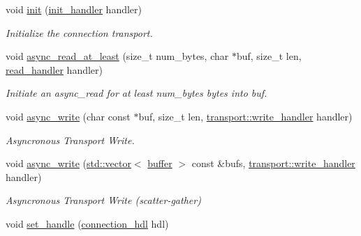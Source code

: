 \begin{DoxyCompactItemize}
\item 
void \mbox{\hyperlink{classwebsocketpp_1_1transport_1_1iostream_1_1connection_a771203b134cc012188a07c471907fc76}{init}} (\mbox{\hyperlink{namespacewebsocketpp_1_1transport_aeae75e675c1a334b3b33ab7120b480a5}{init\+\_\+handler}} handler)
\begin{DoxyCompactList}\small\item\em Initialize the connection transport. \end{DoxyCompactList}\item 
void \mbox{\hyperlink{classwebsocketpp_1_1transport_1_1iostream_1_1connection_ad66fa146a7cdc19bfca3e32da23b9c60}{async\+\_\+read\+\_\+at\+\_\+least}} (size\+\_\+t num\+\_\+bytes, char $\ast$buf, size\+\_\+t len, \mbox{\hyperlink{namespacewebsocketpp_1_1transport_a3a9b2ed54dfcc6ebe7d7e6b4c02f53fb}{read\+\_\+handler}} handler)
\begin{DoxyCompactList}\small\item\em Initiate an async\+\_\+read for at least num\+\_\+bytes bytes into buf. \end{DoxyCompactList}\item 
void \mbox{\hyperlink{classwebsocketpp_1_1transport_1_1iostream_1_1connection_a6bc18b4c6b20bb9bc5d0c41cad53d602}{async\+\_\+write}} (char const $\ast$buf, size\+\_\+t len, \mbox{\hyperlink{namespacewebsocketpp_1_1transport_addf5d728159e7aa2bce2a0df947b1560}{transport\+::write\+\_\+handler}} handler)
\begin{DoxyCompactList}\small\item\em Asyncronous Transport Write. \end{DoxyCompactList}\item 
void \mbox{\hyperlink{classwebsocketpp_1_1transport_1_1iostream_1_1connection_adcc51157786a27f08ffea25025b6d4f8}{async\+\_\+write}} (\mbox{\hyperlink{classstd_1_1vector}{std\+::vector}}$<$ \mbox{\hyperlink{structwebsocketpp_1_1transport_1_1buffer}{buffer}} $>$ const \&bufs, \mbox{\hyperlink{namespacewebsocketpp_1_1transport_addf5d728159e7aa2bce2a0df947b1560}{transport\+::write\+\_\+handler}} handler)
\begin{DoxyCompactList}\small\item\em Asyncronous Transport Write (scatter-\/gather) \end{DoxyCompactList}\item 
void \mbox{\hyperlink{classwebsocketpp_1_1transport_1_1iostream_1_1connection_ac565af9c7f9e86972fd1c20bc369f06d}{set\+\_\+handle}} (\mbox{\hyperlink{namespacewebsocketpp_a6b3d26a10ee7229b84b776786332631d}{connection\+\_\+hdl}} hdl)

\end{DoxyCompactItemize}
